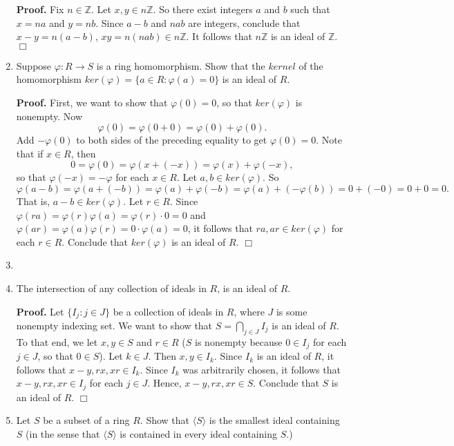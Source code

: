 \documentclass[9pt]{article}
\newcommand{\qed}{\hfill \ensuremath{\Box}}
\newcommand{\cyc}[1]{\langle #1 \rangle}
\newcommand{\Z}{\mathbb{Z}}
\begin{document}
\begin{enumerate}
      \textbf{Proof.} Fix $n \in \Z$. Let $x, y \in n\Z$. So there exist
      integers $a$ and $b$ such that $x = na$ and $y = nb$. Since
      $a - b$ and $nab$ are integers, conclude that $x - y = n(a - b)$, 
      $xy = n(nab) \in n\Z$. It follows that $n\Z$ is an ideal of $\Z$. \qed
   \item Suppose $\varphi : R \rightarrow S$ is a ring homomorphism. Show that
         the $\textit{kernel}$ of the homomorphism
         $ker(\varphi) = \{a \in R : \varphi(a) = 0\}$ is an ideal of $R$.
         
      \textbf{Proof.} First, we want to show that $\varphi(0) = 0$, so that
      $ker(\varphi)$ is nonempty. Now
      $$\varphi(0) = \varphi(0 + 0) = \varphi(0) + \varphi(0).$$
      Add $-\varphi(0)$ to both sides of the preceding equality to get
      $\varphi(0) = 0$. Note that if $x \in R$, then
      $$0 = \varphi(0) = \varphi(x + (-x)) = \varphi(x) + \varphi(-x),$$
      so that $\varphi(-x) = -\varphi$ for each $x \in R$.
      Let $a, b \in ker(\varphi)$. So
      $$\varphi(a - b) = \varphi(a + (-b)) = \varphi(a) + \varphi(-b) =
      \varphi(a) + (-\varphi(b)) = 0 + (-0) = 0  + 0 = 0.$$
      That is, $a - b \in ker(\varphi)$. Let $r \in R$. Since
      $\varphi(ra) = \varphi(r)\varphi(a) = \varphi(r)\cdot 0 = 0$ and
      $\varphi(ar) = \varphi(a)\varphi(r) = 0 \cdot\varphi(a) = 0$, it follows
      that $ra, ar \in ker(\varphi)$ for each $r \in R$. Conclude that
      $ker(\varphi)$ is an ideal of $R$. \qed
   \item 
   \item The intersection of any collection of ideals in $R$, is an ideal of
         $R$.
         
      \textbf{Proof.} Let $\{I_j : j \in J\}$ be a collection of ideals in $R$,
      where $J$ is some nonempty indexing set. We want to show that
      $S = \bigcap_{j \in J}I_j$ is an ideal of $R$. To that end, we let $x, y
      \in S$ and $r \in R$ ($S$ is nonempty because $0 \in I_j$ for each
      $j \in J$, so that $0 \in S$). Let $k \in J$. Then $x, y \in I_k$. Since
      $I_k$ is an ideal of $R$, it follows that $x - y, rx, xr \in I_k$. Since
      $I_k$ was arbitrarily chosen, it follows that $x - y, rx, xr \in I_j$ for
      each $j \in J$. Hence, $x - y, rx, xr \in S$. Conclude that $S$ is an
      ideal of $R$. \qed
   \item Let $S$ be a subset of a ring $R$. Show that $\cyc{S}$ is the smallest
         ideal containing $S$ (in the sense that $\cyc{S}$ is contained in
         every ideal containing $S$.)
         

\end{enumerate}
\end{document}
